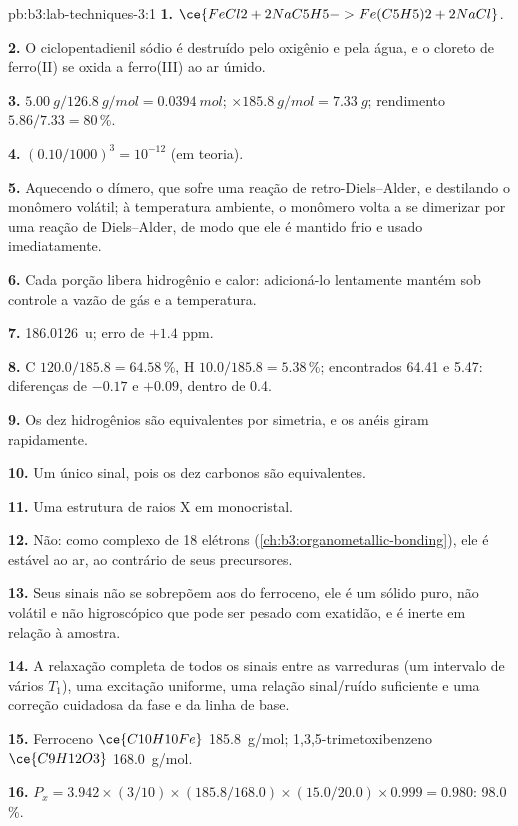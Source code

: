 \begin{solution}{pb:b3:lab-techniques-3:1}
\textbf{1.} $\ce{FeCl2 + 2NaC5H5 -> Fe(C5H5)2 + 2NaCl}$.

\textbf{2.} O ciclopentadienil sódio é destruído pelo oxigênio e pela água, e o cloreto de
ferro(II) se oxida a ferro(III) ao ar úmido.

\textbf{3.} $\qty{5.00}{g}/\qty{126.8}{g/mol} = \qty{0.0394}{mol}$; $\times \qty{185.8}{g/mol} = \qty{7.33}{g}$; rendimento $5.86/7.33 = 80$\,\%.

\textbf{4.} $(0.10/1000)^3 = 10^{-12}$ (em teoria).

\textbf{5.} Aquecendo o dímero, que sofre uma reação de retro-Diels--Alder, e
destilando o monômero volátil; à temperatura ambiente, o monômero volta a se dimerizar
por uma reação de Diels--Alder, de modo que ele é mantido frio e usado imediatamente.

\textbf{6.} Cada porção libera hidrogênio e calor: adicioná-lo lentamente mantém sob controle a vazão
de gás e a temperatura.

\textbf{7.} \qty{186.0126}{u}; erro de $+1.4$ ppm.

\textbf{8.} C $120.0/185.8 = 64.58$\,\%, H $10.0/185.8 = 5.38$\,\%; encontrados 64.41 e 5.47: diferenças de $-0.17$ e $+0.09$, dentro de 0.4.

\textbf{9.} Os dez hidrogênios são equivalentes por simetria, e os anéis giram rapidamente.

\textbf{10.} Um único sinal, pois os dez carbonos são equivalentes.

\textbf{11.} Uma estrutura de raios X em monocristal.

\textbf{12.} Não: como complexo de 18 elétrons (\cref{ch:b3:organometallic-bonding}), ele é estável ao ar, ao contrário de seus
precursores.

\textbf{13.} Seus sinais não se sobrepõem aos do ferroceno, ele é um sólido puro, não volátil e
não higroscópico que pode ser pesado com exatidão, e é inerte em relação à
amostra.

\textbf{14.} A relaxação completa de todos os sinais entre as varreduras (um intervalo de vários $T_1$),
uma excitação uniforme, uma relação sinal/ruído suficiente e uma correção cuidadosa da fase e da
linha de base.

\textbf{15.} Ferroceno $\ce{C10H10Fe}$ \qty{185.8}{g/mol}; 1,3,5-trimetoxibenzeno $\ce{C9H12O3}$ \qty{168.0}{g/mol}.

\textbf{16.} $P_x = 3.942 \times (3/10) \times (185.8/168.0) \times (15.0/20.0) \times 0.999 = 0.980$: 98.0\,\%.


\end{solution}
